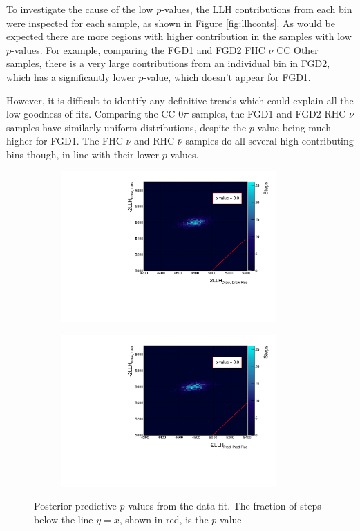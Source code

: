 To investigate the cause of the low $p$-values, the LLH contributions from each bin were inspected for each sample, as shown in Figure \ref{fig:llhconts}. As would be expected there are more regions with higher contribution in the samples with low $p$-values. For example, comparing the FGD1 and FGD2 FHC $\nu$ CC Other samples, there is a very large contributions from an individual bin in FGD2, which has a significantly lower $p$-value, which doesn't appear for FGD1.

However, it is difficult to identify any definitive trends which could explain all the low goodness of fits. Comparing the CC 0$\pi$ samples, the FGD1 and FGD2 RHC $\nu$ samples have similarly uniform distributions, despite the $p$-value being much higher for FGD1. The FHC $\nu$ and RHC $\bar{\nu}$ samples do all several high contributing bins though, in line with their lower $p$-values. 

\begin{figure}
\centering
\begin{subfigure}{.49\textwidth}
  \centering
	\includegraphics*[width=0.9\textwidth,clip]{figs/pval_}
\end{subfigure}
\begin{subfigure}{.49\textwidth}
  \centering
	\includegraphics*[width=0.9\textwidth,clip]{figs/pval2_}
\end{subfigure}
\caption{Posterior predictive $p$-values from the data fit. The fraction of steps below the line $y=x$, shown in red, is the $p$-value}\label{fig:pval}
\end{figure}

